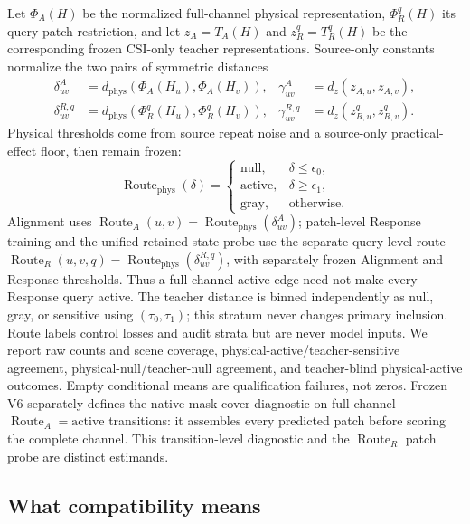 \documentclass{article}
\newcommand{\csi}{H}
\newcommand{\teacher}{T}
\newcommand{\route}{\operatorname{Route}}
\begin{document}
Let $\Phi_A(\csi)$ be the normalized full-channel physical representation,
$\Phi_R^q(\csi)$ its query-patch restriction, and let
$z_A=\teacher_A(\csi)$ and $z_R^q=\teacher_R^q(\csi)$ be the corresponding
frozen CSI-only teacher representations.  Source-only constants normalize the
two pairs of symmetric distances
\begin{equation}
 \begin{aligned}
 \delta^A_{uv}&=d_{\mathrm{phys}}(\Phi_A(\csi_u),\Phi_A(\csi_v)), &
 \gamma^A_{uv}&=d_z(z_{A,u},z_{A,v}),\\
 \delta^{R,q}_{uv}&=d_{\mathrm{phys}}(\Phi_R^q(\csi_u),\Phi_R^q(\csi_v)), &
 \gamma^{R,q}_{uv}&=d_z(z^q_{R,u},z^q_{R,v}).
 \end{aligned}
\end{equation}
Physical thresholds come from source repeat noise and a source-only
practical-effect floor, then remain frozen:
\begin{equation}
\route_{\mathrm{phys}}(\delta)=
\begin{cases}
\mathrm{null}, & \delta\le\epsilon_0,\\
\mathrm{active}, & \delta\ge\epsilon_1,\\
\mathrm{gray}, & \text{otherwise}.
\end{cases}
\label{eq:route}
\end{equation}
Alignment uses $\route_A(u,v)=\route_{\mathrm{phys}}(\delta^A_{uv})$;
patch-level Response training and the unified retained-state probe use the
separate query-level route
$\route_R(u,v,q)=\route_{\mathrm{phys}}(\delta^{R,q}_{uv})$, with separately
frozen Alignment and Response thresholds.  Thus a full-channel active edge need
not make every Response query active.  The teacher distance is binned
independently as null, gray, or sensitive using $(\tau_0,\tau_1)$; this stratum
never changes primary inclusion.  Route labels control losses and audit strata
but are never model inputs.  We report raw counts and scene coverage,
physical-active/teacher-sensitive agreement, physical-null/teacher-null
agreement, and teacher-blind physical-active outcomes.  Empty conditional means
are qualification failures, not zeros.  Frozen V6 separately defines the native
mask-cover diagnostic on full-channel $\route_A=\mathrm{active}$ transitions:
it assembles every predicted patch before scoring the complete channel.  This
transition-level diagnostic and the $\route_R$ patch probe are distinct
estimands.

\subsection{What compatibility means}
\end{document}
